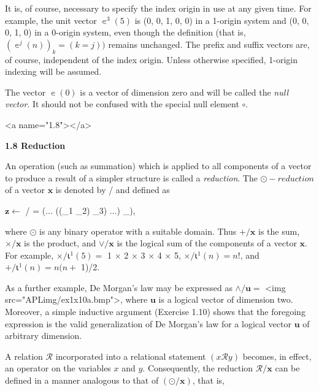 \par It is, of course, necessary to specify the index origin in use at any given time. For example, the unit vector $∊^{3}(5)$ is (0, 0, 1, 0, 0) in a 1-origin system and (0, 0, 0, 1, 0) in a 0-origin system, even though the definition (that is, $(∊^{ j}(n))_{k} = (k = j))$ remains unchanged. The prefix and suffix vectors are, of course, independent of the index origin. Unless otherwise specified, 1-origin indexing will be assumed.

\par The vector $∊(0)$ is a vector of dimension zero and will be called the \textit{null vector}. It should not be confused with the special null element $∘$.

<a name="1.8"></a>
\par \textbf{1.8 Reduction}

\par An operation (such as summation) which is applied to all components of a vector to produce a result of a simpler structure is called a \textit{reduction}. The $\odot-reduction$ of a vector $\mathbf{x}$ is denoted by
\odot/ and defined as

\par $\mathbf{z} ←$ 
\odot/ \leftrightarrow {} = (... ((_{1}
\odot {}_{2})
\odot {}_{3})
\odot ...) 
\odot {}_{\textit{\nu}}),

\par where $\odot$ is any binary operator with a suitable domain. Thus $+/\mathbf{x}$ is the sum, $\times/\mathbf{x}$ is the product, and $\vee/\mathbf{x}$ is the logical sum of the components of a vector $\mathbf{x}$. For example, $\times/⍳^{1}(5) =$ 1 $\times$ 2 $\times$ 3 $\times$ 4 $\times$ 5, $\times/⍳^{1}(n) = n!$, and $+/⍳^{1}(n) = n(n +$ 1)/2.

\par As a further example, De Morgan's law may be expressed as $\wedge/\mathbf{u} =$ <img src="APLimg/ex1x10a.bmp">, where $\mathbf{u}$ is a logical vector of dimension two. Moreover, a simple inductive argument (Exercise 1.10) shows that the foregoing expression is the valid generalization of De Morgan's law for a logical vector $\mathbf{u}$ of arbitrary dimension.

\par A relation $\mathcal{R}$ incorporated into a relational statement $(x\mathcal{R}y)$ becomes, in effect, an operator on the variables $x$ and $y$. Consequently, the reduction $\mathcal{R}/\mathbf{x}$ can be defined in a manner analogous to that of $(\odot/\mathbf{x})$, that is,

